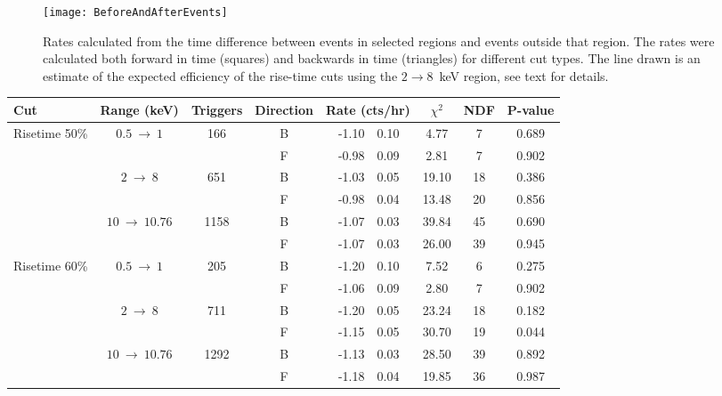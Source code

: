 			\begin{figure}
				\centering
				\texttt{[image: BeforeAndAfterEvents]}
				\caption[Rates calculated from the time difference between events in selected regions]
				{Rates calculated from the time difference between events in selected regions and events outside that region.  The rates were calculated both forward
				in time (squares) and backwards in time (triangles) for different cut types.  The line drawn is an estimate of the 
				expected efficiency of the rise-time cuts using the $2\to8$~keV region, see text for details.}
				\label{fig:BeGeForBack}
			\end{figure}	
			
			\begin{table} \scriptsize
				\centering
				\renewcommand{\arraystretch}{0.75}
				\begin{tabular}{l  c  c  c  r@{$~\pm~$}l  c  c  c } 
				\toprule
					Cut & Range (keV) & Triggers & Direction & \multicolumn{2}{c}{Rate (cts/hr)} & $\chi^2$ & NDF & P-value  \\
				\midrule
				\multirow{6}{*}{Risetime 50\%}& \multirow{2}{*}{$0.5~\to~1$} & \multirow{2}{*}{166}	& B & -1.10 & 0.10 & 4.77 & 7 & 0.689\\
					& & & F & -0.98 & 0.09 & 2.81 & 7 & 0.902\\
				& \multirow{2}{*}{$2~\to~8$} & \multirow{2}{*}{651}	& B & -1.03 & 0.05 & 19.10 & 18 & 0.386\\
					& & & F & -0.98 & 0.04 & 13.48 & 20 & 0.856\\
				& \multirow{2}{*}{$10~\to~10.76$} & \multirow{2}{*}{1158}	& B & -1.07 & 0.03 & 39.84 & 45 & 0.690\\
					& & & F & -1.07 & 0.03 & 26.00 & 39 & 0.945\\
				\midrule
				
				\multirow{6}{*}{Risetime 60\%}& \multirow{2}{*}{$0.5~\to~1$} & \multirow{2}{*}{205}	& B & -1.20 & 0.10 & 7.52 & 6 & 0.275\\
					& & & F & -1.06 & 0.09 & 2.80 & 7 & 0.902\\
				& \multirow{2}{*}{$2~\to~8$} & \multirow{2}{*}{711}	& B & -1.20 & 0.05 & 23.24 & 18 & 0.182\\
					& & & F & -1.15 & 0.05 & 30.70 & 19 & 0.044\\
				& \multirow{2}{*}{$10~\to~10.76$} & \multirow{2}{*}{1292}	& B & -1.13 & 0.03 & 28.50 & 39 & 0.892\\
					& & & F & -1.18 & 0.04 & 19.85 & 36 & 0.987\\
				\midrule
				

\end{tabular}
\end{table}
